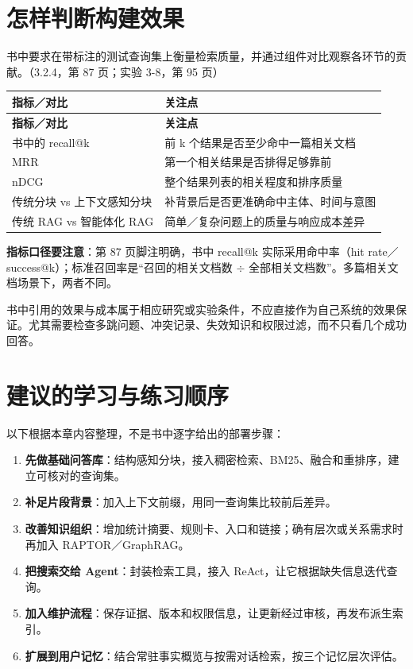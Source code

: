 \documentclass[UTF8,a4paper,11pt]{ctexart}
\newlength{\tableusable}
\newcommand{\code}[1]{{\small\ttfamily #1}}
\begin{document}
\section{怎样判断构建效果}

书中要求在带标注的测试查询集上衡量检索质量，并通过组件对比观察各环节的贡献。（3.2.4，第 87 页；实验 3-8，第 95 页）

\begingroup\small
\setlength{\tableusable}{\dimexpr\linewidth-2\tabcolsep\relax}
\begin{longtable}{@{}>{\raggedright\arraybackslash}p{0.3\tableusable}>{\raggedright\arraybackslash}p{0.7\tableusable}@{}}
\toprule
\textbf{指标／对比} & \textbf{关注点} \\
\midrule\endfirsthead
\toprule
\textbf{指标／对比} & \textbf{关注点} \\
\midrule\endhead
\bottomrule\endfoot
书中的 \code{recall@k} & 前 k 个结果是否至少命中一篇相关文档 \\
MRR & 第一个相关结果是否排得足够靠前 \\
nDCG & 整个结果列表的相关程度和排序质量 \\
传统分块 vs 上下文感知分块 & 补背景后是否更准确命中主体、时间与意图 \\
传统 RAG vs 智能体化 RAG & 简单／复杂问题上的质量与响应成本差异 \\
\end{longtable}\endgroup

\textbf{指标口径要注意}：第 87 页脚注明确，书中 \code{recall@k} 实际采用命中率（hit rate／success@k）；标准召回率是“召回的相关文档数 \(\div\) 全部相关文档数”。多篇相关文档场景下，两者不同。

书中引用的效果与成本属于相应研究或实验条件，不应直接作为自己系统的效果保证。尤其需要检查多跳问题、冲突记录、失效知识和权限过滤，而不只看几个成功回答。

\section{建议的学习与练习顺序}

以下根据本章内容整理，不是书中逐字给出的部署步骤：

\begin{enumerate}
\item \textbf{先做基础问答库}：结构感知分块，接入稠密检索、BM25、融合和重排序，建立可核对的查询集。
\item \textbf{补足片段背景}：加入上下文前缀，用同一查询集比较前后差异。
\item \textbf{改善知识组织}：增加统计摘要、规则卡、入口和链接；确有层次或关系需求时再加入 RAPTOR／GraphRAG。
\item \textbf{把搜索交给 Agent}：封装检索工具，接入 ReAct，让它根据缺失信息迭代查询。
\item \textbf{加入维护流程}：保存证据、版本和权限信息，让更新经过审核，再发布派生索引。
\item \textbf{扩展到用户记忆}：结合常驻事实概览与按需对话检索，按三个记忆层次评估。
\end{enumerate}
\end{document}
